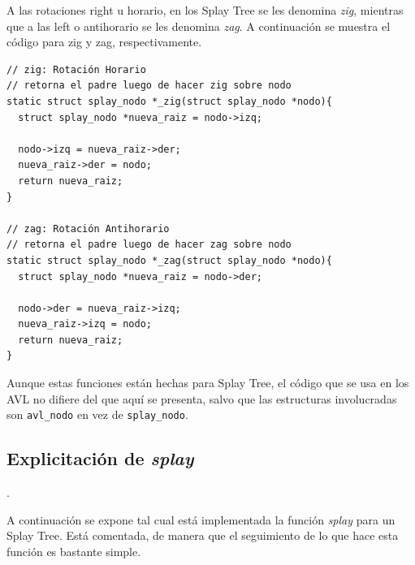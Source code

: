\documentclass[12pt,letterpaper]{report}
\begin{document}
A las rotaciones right u horario, en los Splay Tree se les denomina \emph{zig}, mientras que a las left o antihorario se les denomina \emph{zag}. A continuación se muestra el código para zig y zag, respectivamente.\\

\begin{verbatim}
// zig: Rotación Horario
// retorna el padre luego de hacer zig sobre nodo
static struct splay_nodo *_zig(struct splay_nodo *nodo){
  struct splay_nodo *nueva_raiz = nodo->izq;

  nodo->izq = nueva_raiz->der;
  nueva_raiz->der = nodo;
  return nueva_raiz;
}

// zag: Rotación Antihorario
// retorna el padre luego de hacer zag sobre nodo
static struct splay_nodo *_zag(struct splay_nodo *nodo){
  struct splay_nodo *nueva_raiz = nodo->der;

  nodo->der = nueva_raiz->izq;
  nueva_raiz->izq = nodo;
  return nueva_raiz;
}
\end{verbatim}

Aunque estas funciones están hechas para Splay Tree, el código que se usa en los AVL no difiere del que aquí se presenta, salvo que las estructuras involucradas son \texttt{avl\_nodo} en vez de \texttt{splay\_nodo}.

\subsection{Explicitación de \emph{splay}}.
\label{subsec:splay_anexos}

A continuación se expone tal cual está implementada la función \emph{splay} para un Splay Tree. Está comentada, de manera que el seguimiento de lo que hace esta función es bastante simple.\\
\end{document}
